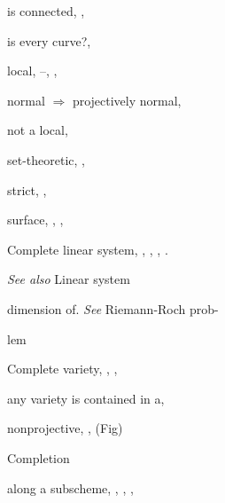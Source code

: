 {{\noindent\hspace*{7.5bp}is connected, , \par
\noindent\hspace*{7.5bp}is every curve?, \par
\noindent\hspace*{7.5bp}local, --, , \par
\noindent\hspace*{7.5bp}normal $\Rightarrow$ projectively normal, \par
\noindent\hspace*{7.5bp}not a local, \par
\noindent\hspace*{7.5bp}set-theoretic, , \par
\noindent\hspace*{7.5bp}strict, , \par
\noindent\hspace*{7.5bp}surface, , , \par
\noindent\hspace*{0.0bp}Complete linear system, , , , .\par
\noindent\hspace*{15.0bp}\emph{See also} Linear system\par
\noindent\hspace*{7.5bp}dimension of. \emph{See} Riemann-Roch prob-\par
\noindent\hspace*{15.0bp}lem\par
\noindent\hspace*{0.0bp}Complete variety, , , \par
\noindent\hspace*{7.5bp}any variety is contained in a, \par
\noindent\hspace*{7.5bp}nonprojective, ,  (Fig)\par
\noindent\hspace*{0.0bp}Completion\par
\noindent\hspace*{7.5bp}along a subscheme, , , , \par
}}
